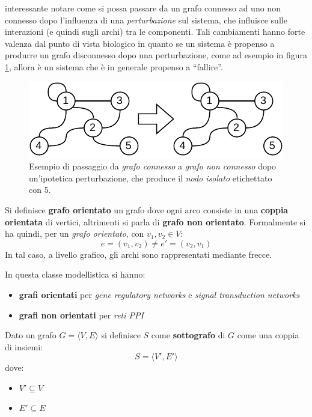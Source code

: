 \documentclass[a4paper,12pt, oneside]{book}
\begin{document}
interessante notare come si possa passare da un grafo connesso ad uno non
connesso dopo l'influenza di una \textit{perturbazione} sul sistema, che
influisce sulle interazioni (e quindi sugli archi) tra le componenti. Tali
cambiamenti hanno forte valenza dal punto di vista biologico in quanto se un
sistema è propenso a produrre un grafo disconnesso dopo una perturbazione, come
ad esempio in figura \ref{fig:conn}, allora è un sistema che è in generale
propenso a ``fallire''. 
\begin{figure}
  \centering
  \includegraphics[scale = 1.35]{img/ncon.pdf}
  \caption{Esempio di passaggio da \textit{grafo connesso} a \textit{grafo non
      connesso} dopo un'ipotetica perturbazione, che produce il \textit{nodo
      isolato} etichettato con 5.} 
  \label{fig:conn}
\end{figure}
\begin{definizione}
  Si definisce \textbf{grafo orientato} un grafo dove ogni arco consiste in una
  \textbf{coppia orientata} di vertici, altrimenti si parla di \textbf{grafo non
    orientato}. Formalmente si ha quindi, per un \textit{grafo orientato}, con
  $v_1,v_2\in V$: 
  \[e=(v_1,v_2)\neq e'=(v_2,v_1)\]
  In tal caso, a livello grafico, gli archi sono rappresentati mediante frecce.
\end{definizione}
In questa classe modellistica si hanno:
\begin{itemize}
  \item \textbf{grafi orientati} per \textit{gene regulatory networks} e
  \textit{signal transduction networks}
  \item \textbf{grafi non orientati} per \textit{reti PPI}
\end{itemize}
\begin{definizione}
  Dato un grafo $G=\langle V, E\rangle$ si definisce $S$ come
  \textbf{sottografo} di $G$ come una coppia di insiemi:
  \[S=\langle V', E'\rangle\]
  dove:
  \begin{itemize}
    \item $V'\subseteq V$
    \item $E'\subseteq E$
  \end{itemize}
\end{definizione}
\end{document}
